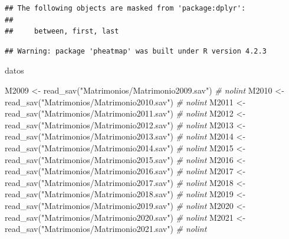 \documentclass[
]{article}
\newenvironment{Shaded}{\begin{snugshade}}{\end{snugshade}}
\newcommand{\CommentTok}[1]{\textcolor[rgb]{0.56,0.35,0.01}{\textit{#1}}}
\newcommand{\FunctionTok}[1]{\textcolor[rgb]{0.00,0.00,0.00}{#1}}
\newcommand{\NormalTok}[1]{#1}
\newcommand{\OtherTok}[1]{\textcolor[rgb]{0.56,0.35,0.01}{#1}}
\newcommand{\StringTok}[1]{\textcolor[rgb]{0.31,0.60,0.02}{#1}}
\begin{document}
\begin{verbatim}
## The following objects are masked from 'package:dplyr':
## 
##     between, first, last
\end{verbatim}

\begin{verbatim}
## Warning: package 'pheatmap' was built under R version 4.2.3
\end{verbatim}

datos

\begin{Shaded}
\begin{Highlighting}[]
\NormalTok{M2009 }\OtherTok{\textless{}{-}} \FunctionTok{read\_sav}\NormalTok{(}\StringTok{"Matrimonios/Matrimonio2009.sav"}\NormalTok{) }\CommentTok{\# nolint}
\NormalTok{M2010 }\OtherTok{\textless{}{-}} \FunctionTok{read\_sav}\NormalTok{(}\StringTok{"Matrimonios/Matrimonio2010.sav"}\NormalTok{) }\CommentTok{\# nolint}
\NormalTok{M2011 }\OtherTok{\textless{}{-}} \FunctionTok{read\_sav}\NormalTok{(}\StringTok{"Matrimonios/Matrimonio2011.sav"}\NormalTok{) }\CommentTok{\# nolint}
\NormalTok{M2012 }\OtherTok{\textless{}{-}} \FunctionTok{read\_sav}\NormalTok{(}\StringTok{"Matrimonios/Matrimonio2012.sav"}\NormalTok{) }\CommentTok{\# nolint}
\NormalTok{M2013 }\OtherTok{\textless{}{-}} \FunctionTok{read\_sav}\NormalTok{(}\StringTok{"Matrimonios/Matrimonio2013.sav"}\NormalTok{) }\CommentTok{\# nolint}
\NormalTok{M2014 }\OtherTok{\textless{}{-}} \FunctionTok{read\_sav}\NormalTok{(}\StringTok{"Matrimonios/Matrimonio2014.sav"}\NormalTok{) }\CommentTok{\# nolint}
\NormalTok{M2015 }\OtherTok{\textless{}{-}} \FunctionTok{read\_sav}\NormalTok{(}\StringTok{"Matrimonios/Matrimonio2015.sav"}\NormalTok{) }\CommentTok{\# nolint}
\NormalTok{M2016 }\OtherTok{\textless{}{-}} \FunctionTok{read\_sav}\NormalTok{(}\StringTok{"Matrimonios/Matrimonio2016.sav"}\NormalTok{) }\CommentTok{\# nolint}
\NormalTok{M2017 }\OtherTok{\textless{}{-}} \FunctionTok{read\_sav}\NormalTok{(}\StringTok{"Matrimonios/Matrimonio2017.sav"}\NormalTok{) }\CommentTok{\# nolint}
\NormalTok{M2018 }\OtherTok{\textless{}{-}} \FunctionTok{read\_sav}\NormalTok{(}\StringTok{"Matrimonios/Matrimonio2018.sav"}\NormalTok{) }\CommentTok{\# nolint}
\NormalTok{M2019 }\OtherTok{\textless{}{-}} \FunctionTok{read\_sav}\NormalTok{(}\StringTok{"Matrimonios/Matrimonio2019.sav"}\NormalTok{) }\CommentTok{\# nolint}
\NormalTok{M2020 }\OtherTok{\textless{}{-}} \FunctionTok{read\_sav}\NormalTok{(}\StringTok{"Matrimonios/Matrimonio2020.sav"}\NormalTok{) }\CommentTok{\# nolint}
\NormalTok{M2021 }\OtherTok{\textless{}{-}} \FunctionTok{read\_sav}\NormalTok{(}\StringTok{"Matrimonios/Matrimonio2021.sav"}\NormalTok{) }\CommentTok{\# nolint}
\end{Highlighting}
\end{Shaded}
\end{document}

